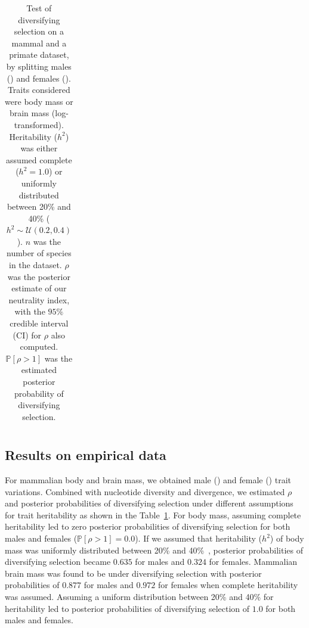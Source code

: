 \documentclass{article}
\newcommand{\proba}{\mathbb{P}}
\newcommand{\NbrTaxa}{n}
\newcommand{\Heritability}{h^2}
\newcommand{\NI}{\rho}
\begin{document}
\begin{table}[t!]
\begin{adjustbox}{width = 0.75\textwidth}
\begin{tabular}{||l|l|l|c|c|c|c|c||}
        \bottomrule
        \end{tabular}
    \end{adjustbox}
    \caption{
    Test of diversifying selection on a mammal and a primate dataset, by splitting males (\Male) and females (\Female).
    Traits considered were body mass or brain mass (log-transformed).
    Heritability ($\Heritability$) was either assumed complete ($\Heritability=1.0$) or uniformly distributed between 20\% and 40\%  ($\Heritability \sim \mathcal{U}(0.2, 0.4)$).
    $\NbrTaxa$ was the number of species in the dataset.
    $\NI$ was the posterior estimate of our neutrality index, with the $95\%$ credible interval (CI) for $\NI$ also computed.
    $\proba [\NI > 1 ]$ was the estimated posterior probability of diversifying selection.
    }
    \label{table:empirical}
\end{table}

\subsection*{Results on empirical data}\label{subsec:results-on-empirical-data}

For mammalian body and brain mass, we obtained male (\Male) and female (\Female) trait variations.
Combined with nucleotide diversity and divergence, we estimated $\NI$ and posterior probabilities of diversifying selection under different assumptions for trait heritability as shown in the Table~\ref{table:empirical}.
For body mass, assuming complete heritability led to zero posterior probabilities of diversifying selection for both males and females ($\proba [\NI > 1 ] = 0.0$).
If we assumed that heritability ($\Heritability$) of body mass was uniformly distributed between 20\% and 40\%~\citep{hu_bringing_2022}, posterior probabilities of diversifying selection became $0.635$ for males and $0.324$ for females.
Mammalian brain mass was found to be under diversifying selection with posterior probabilities of $0.877$ for males and $0.972$ for females when complete heritability was assumed.
Assuming a uniform distribution between 20\% and 40\% for heritability led to posterior probabilities of diversifying selection of $1.0$ for both males and females.
\end{document}
